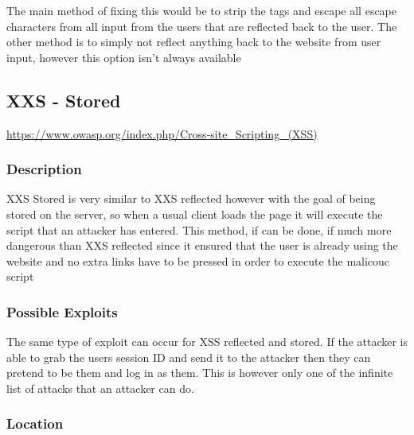 \documentclass[titlepage]{article}
\begin{document}
      The main method of fixing this would be to strip the tags and escape all escape characters from all input from the users that are reflected back to the user. The other method is to simply not reflect anything back to the website from user input, however this option isn't always available
      

   
   \subsection{XXS - Stored} %
   \label{sub:xxs_stored}

      \url{https://www.owasp.org/index.php/Cross-site_Scripting_(XSS)}
   
      \subsubsection{Description} %
      \label{ssub:xxs_stored_description}

      XXS Stored is very similar to XXS reflected however with the goal of being stored on the server, so when a usual client loads the page it will execute the script that an attacker has entered. This method, if can be done, if much more dangerous than XXS reflected since it ensured that the user is already using the website and no extra links have to be pressed in order to execute the malicouc script


      \subsubsection{Possible Exploits} %
      \label{ssub:xxs_stored_possible_exploits}
      
      The same type of exploit can occur for XSS reflected and stored. If the attacker is able to grab the users session ID and send it to the attacker then they can pretend to be them and log in as them. This is however only one of the infinite list of attacks that an attacker can do.


      \subsubsection{Location} %
      \label{ssub:xxs_stored_location}
\end{document}
